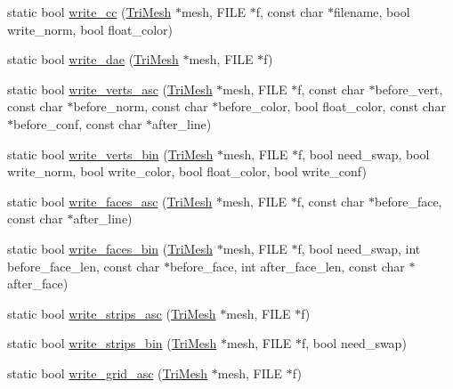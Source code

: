 \begin{DoxyCompactItemize}
static bool \hyperlink{namespacetrimesh_a25928ef7b7afbe31c7ed54639b496745}{write\+\_\+cc} (\hyperlink{classtrimesh_1_1TriMesh}{Tri\+Mesh} $\ast$mesh, F\+I\+LE $\ast$f, const char $\ast$filename, bool write\+\_\+norm, bool float\+\_\+color)
\item 
static bool \hyperlink{namespacetrimesh_a04f0ec0ebcad013e537bcd150a3b0d0f}{write\+\_\+dae} (\hyperlink{classtrimesh_1_1TriMesh}{Tri\+Mesh} $\ast$mesh, F\+I\+LE $\ast$f)
\item 
static bool \hyperlink{namespacetrimesh_a2c61b5ad47a44a375a685a560ce2a65a}{write\+\_\+verts\+\_\+asc} (\hyperlink{classtrimesh_1_1TriMesh}{Tri\+Mesh} $\ast$mesh, F\+I\+LE $\ast$f, const char $\ast$before\+\_\+vert, const char $\ast$before\+\_\+norm, const char $\ast$before\+\_\+color, bool float\+\_\+color, const char $\ast$before\+\_\+conf, const char $\ast$after\+\_\+line)
\item 
static bool \hyperlink{namespacetrimesh_a91ab9bd3b846abce4b51ba90a33fef53}{write\+\_\+verts\+\_\+bin} (\hyperlink{classtrimesh_1_1TriMesh}{Tri\+Mesh} $\ast$mesh, F\+I\+LE $\ast$f, bool need\+\_\+swap, bool write\+\_\+norm, bool write\+\_\+color, bool float\+\_\+color, bool write\+\_\+conf)
\item 
static bool \hyperlink{namespacetrimesh_af34167be8d3e30e738788609dfbf54b5}{write\+\_\+faces\+\_\+asc} (\hyperlink{classtrimesh_1_1TriMesh}{Tri\+Mesh} $\ast$mesh, F\+I\+LE $\ast$f, const char $\ast$before\+\_\+face, const char $\ast$after\+\_\+line)
\item 
static bool \hyperlink{namespacetrimesh_a0f0f9330c1eb34423e1c8801d656dbd9}{write\+\_\+faces\+\_\+bin} (\hyperlink{classtrimesh_1_1TriMesh}{Tri\+Mesh} $\ast$mesh, F\+I\+LE $\ast$f, bool need\+\_\+swap, int before\+\_\+face\+\_\+len, const char $\ast$before\+\_\+face, int after\+\_\+face\+\_\+len, const char $\ast$after\+\_\+face)
\item 
static bool \hyperlink{namespacetrimesh_af23e1f26acdc3458b41fe189fee226c3}{write\+\_\+strips\+\_\+asc} (\hyperlink{classtrimesh_1_1TriMesh}{Tri\+Mesh} $\ast$mesh, F\+I\+LE $\ast$f)
\item 
static bool \hyperlink{namespacetrimesh_accf791e366c5f89485b9d96029db2f13}{write\+\_\+strips\+\_\+bin} (\hyperlink{classtrimesh_1_1TriMesh}{Tri\+Mesh} $\ast$mesh, F\+I\+LE $\ast$f, bool need\+\_\+swap)
\item 
static bool \hyperlink{namespacetrimesh_a70bf1a4c22873759ab16a3dd15c4877d}{write\+\_\+grid\+\_\+asc} (\hyperlink{classtrimesh_1_1TriMesh}{Tri\+Mesh} $\ast$mesh, F\+I\+LE $\ast$f)
\item 

\end{DoxyCompactItemize}
